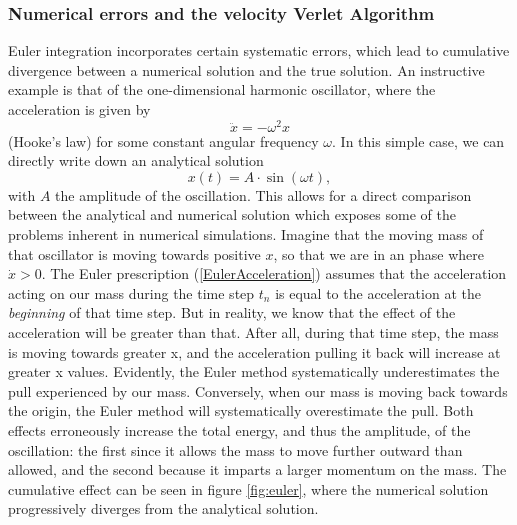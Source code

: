 \documentclass[11pt,twocolumn]{article}
\begin{document}
			\subsubsection{Numerical errors and the velocity Verlet Algorithm}
			\label{StabilitySection}
			Euler integration incorporates certain systematic errors, which lead to cumulative divergence between a numerical solution and the true solution. An instructive example is that of the one-dimensional harmonic oscillator, where the acceleration is given by
			\begin{equation}
			\ddot{x} = -\omega^2 x
            \label{Hooke}
			\end{equation}
			(Hooke's law) for some constant angular frequency $\omega$. In this simple case, we can directly write down an analytical solution 
			\begin{equation}
			x(t)  = A\cdot \sin(\omega t),
			\end{equation}
			with $A$ the amplitude of the oscillation. This allows for a direct comparison between the analytical and numerical solution which exposes some of the problems inherent in numerical simulations.			
			Imagine that the moving mass of that oscillator is moving towards positive $x$, so that  we are in an phase where $\dot{x}>0$. 
			The Euler prescription (\ref{EulerAcceleration}) assumes that the acceleration acting on our mass during the time step $t_n$ is equal to the acceleration at the {\em beginning} of that time step. But in reality, we know that the effect of the acceleration will be greater than that. After all, during that time step, the mass is moving towards greater x, and the acceleration pulling it back will increase at greater x values. Evidently, the Euler method systematically underestimates the pull experienced by our mass. Conversely, when our mass is moving back towards the origin, the Euler method will systematically overestimate the pull. Both effects erroneously increase the total energy, and thus the amplitude, of the oscillation: the first since it allows the mass to move further outward than allowed, and the second because it imparts a larger momentum on the mass. The cumulative effect can be seen in figure \ref{fig:euler}, where the numerical solution progressively diverges from the analytical solution. 
			
\end{document}
